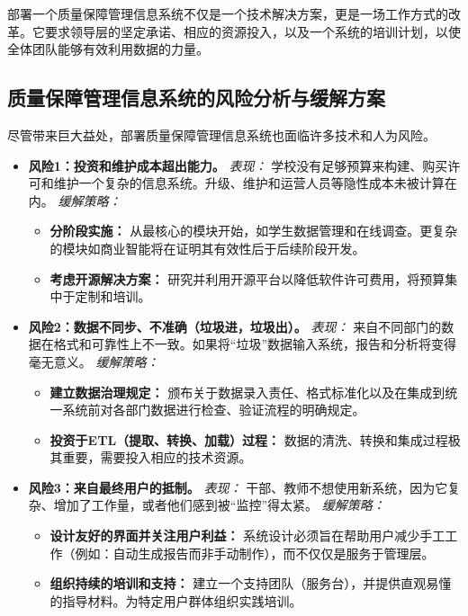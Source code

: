 部署一个质量保障管理信息系统不仅是一个技术解决方案，更是一场工作方式的改革。它要求领导层的坚定承诺、相应的资源投入，以及一个系统的培训计划，以使全体团队能够有效利用数据的力量。

\subsection{质量保障管理信息系统的风险分析与缓解方案}
\label{subsec:risk_qamis}
尽管带来巨大益处，部署质量保障管理信息系统也面临许多技术和人为风险。

\begin{itemize}
    \item \textbf{风险1：投资和维护成本超出能力。}
    \textit{表现：} 学校没有足够预算来构建、购买许可和维护一个复杂的信息系统。升级、维护和运营人员等隐性成本未被计算在内。
    \textit{缓解策略：}
    \begin{itemize}
        \item \textbf{分阶段实施：} 从最核心的模块开始，如学生数据管理和在线调查。更复杂的模块如商业智能将在证明其有效性后于后续阶段开发。
        \item \textbf{考虑开源解决方案：} 研究并利用开源平台以降低软件许可费用，将预算集中于定制和培训。
    \end{itemize}

    \item \textbf{风险2：数据不同步、不准确（垃圾进，垃圾出）。}
    \textit{表现：} 来自不同部门的数据在格式和可靠性上不一致。如果将“垃圾”数据输入系统，报告和分析将变得毫无意义。
    \textit{缓解策略：}
    \begin{itemize}
        \item \textbf{建立数据治理规定：} 颁布关于数据录入责任、格式标准化以及在集成到统一系统前对各部门数据进行检查、验证流程的明确规定。
        \item \textbf{投资于ETL（提取、转换、加载）过程：} 数据的清洗、转换和集成过程极其重要，需要投入相应的技术资源。
    \end{itemize}
    
    \item \textbf{风险3：来自最终用户的抵制。}
    \textit{表现：} 干部、教师不想使用新系统，因为它复杂、增加了工作量，或者他们感到被“监控”得太紧。
    \textit{缓解策略：}
    \begin{itemize}
        \item \textbf{设计友好的界面并关注用户利益：} 系统设计必须旨在帮助用户减少手工工作（例如：自动生成报告而非手动制作），而不仅仅是服务于管理层。
        \item \textbf{组织持续的培训和支持：} 建立一个支持团队（服务台），并提供直观易懂的指导材料。为特定用户群体组织实践培训。
    \end{itemize}
\end{itemize}


























